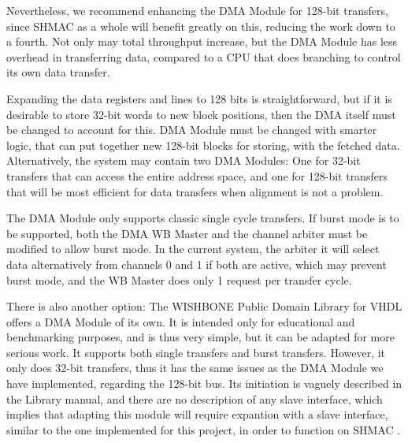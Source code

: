Nevertheless, we recommend enhancing the DMA Module for 128-bit transfers, since SHMAC as a whole will benefit greatly on this, reducing the work down to a fourth.
Not only may total throughput increase, but the DMA Module has less overhead in transferring data, compared to a CPU that does branching to control its own data transfer.

Expanding the data registers and lines to 128 bits is straightforward, but if it is desirable to store 32-bit words to new block positions, then the DMA itself must be changed to account for this.
DMA Module must be changed with smarter logic, that can put together new 128-bit blocks for storing, with the fetched data.
Alternatively, the system may contain two DMA Modules: One for 32-bit transfers that can access the entire address space, and one for 128-bit transfers that will be most efficient for data transfers when alignment is not a problem.

The DMA Module only supports classic single cycle transfers.
If burst mode is to be supported, both the DMA WB Master and the channel arbiter must be modified to allow burst mode.
In the current system, the arbiter it will select data alternatively from channels 0 and 1 if both are active, which may prevent burst mode, and the WB Master does only 1 request per transfer cycle.     

There is also another option: The WISHBONE Public Domain Library for VHDL offers a DMA Module of its own.
It is intended only for educational and benchmarking purposes, and is thus very simple, but it can be adapted for more serious work.
It supports both single transfers and burst transfers.
However, it only does 32-bit transfers, thus it has the same issues as the DMA Module we have implemented, regarding the 128-bit bus.
Its initiation is vaguely described in the Library manual, and there are no description of any slave interface, which implies that adapting this module will require expantion with a slave interface, similar to the one implemented for this project, in order to function on SHMAC
\cite{WBLibrary}.